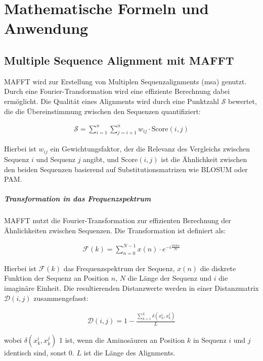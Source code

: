 \chapter{Mathematische Formeln und Anwendung} \label{chap:mathematische-formeln}

\section{Multiple Sequence Alignment mit MAFFT} \label{sec:mafft-mathematik}

MAFFT wird zur Erstellung von Multiplen Sequenzalignments (\gls{msa}) genutzt. Durch eine Fourier-Transformation wird eine effiziente Berechnung dabei ermöglicht. Die Qualität eines Alignments wird durch eine Punktzahl $\mathcal{S}$ bewertet, die die Übereinstimmung zwischen den Sequenzen quantifiziert:

\begin{align}
    \mathcal{S} = \sum_{i=1}^n \sum_{j=i+1}^n w_{ij} \cdot \text{Score}(i, j)
\end{align}

Hierbei ist $w_{ij}$ ein Gewichtungsfaktor, der die Relevanz des Vergleichs zwischen Sequenz $i$ und Sequenz $j$ angibt, und $\text{Score}(i, j)$ ist die Ähnlichkeit zwischen den beiden Sequenzen basierend auf Substitutionsmatrizen wie BLOSUM oder PAM.

\paragraph{Transformation in das Frequenzspektrum}
MAFFT nutzt die Fourier-Transformation zur effizienten Berechnung der Ähnlichkeiten zwischen Sequenzen. Die Transformation ist definiert als:

\begin{align}
    \mathcal{F}(k) = \sum_{n=0}^{N-1} x(n) \cdot e^{-i \frac{2\pi k n}{N}}
\end{align}

Hierbei ist $\mathcal{F}(k)$ das Frequenzspektrum der Sequenz, $x(n)$ die diskrete Funktion der Sequenz an Position $n$, $N$ die Länge der Sequenz und $i$ die imaginäre Einheit. Die resultierenden Distanzwerte werden in einer Distanzmatrix $\mathcal{D}(i, j)$ zusammengefasst:

\begin{align}
    \mathcal{D}(i, j) = 1 - \frac{\sum_{k=1}^L \delta(x_k^i, x_k^j)}{L}
\end{align}

wobei $\delta(x_k^i, x_k^j)$ 1 ist, wenn die Aminosäuren an Position $k$ in Sequenz $i$ und $j$ identisch sind, sonst 0. $L$ ist die Länge des Alignments.

